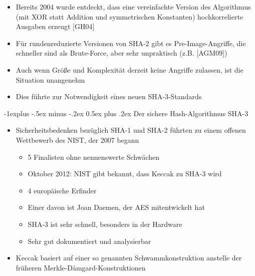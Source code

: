 \documentclass[a4paper]{article}
\makeatletter
\renewcommand{\subsection}{\@startsection{subsection}{2}{0mm}%
 {-1explus -.5ex minus -.2ex}%
 {0.5ex plus .2ex}%
 {\normalfont\normalsize\bfseries}}
\makeatother
\begin{document}
\begin{multicols}{3}
\begin{itemize}
\begin{itemize}
                        \begin{itemize}
                            \item
                                  Bereits 2004 wurde entdeckt, dass eine vereinfachte Version des
                                  Algorithmus (mit XOR statt Addition und symmetrischen Konstanten)
                                  hochkorrelierte Ausgaben erzeugt {[}GH04{]}
                            \item
                                  Für rundenreduzierte Versionen von SHA-2 gibt es
                                  Pre-Image-Angriffe, die schneller sind als Brute-Force, aber sehr
                                  unpraktisch (z.B. {[}AGM09{]})
                            \item
                                  Auch wenn Größe und Komplexität derzeit keine Angriffe zulassen,
                                  ist die Situation unangenehm
                            \item
                                  Dies führte zur Notwendigkeit eines neuen SHA-3-Standards
                        \end{itemize}
              \end{itemize}
    \end{itemize}


    \subsection{Der sichere Hash-Algorithmus
        SHA-3}

    \begin{itemize}
        \item
              Sicherheitsbedenken bezüglich SHA-1 und SHA-2 führten zu einem offenen
              Wettbewerb des NIST, der 2007 begann

              \begin{itemize}
                  \item
                        5 Finalisten ohne nennenswerte Schwächen
                  \item
                        Oktober 2012: NIST gibt bekannt, dass Keccak zu SHA-3 wird
                  \item
                        4 europäische Erfinder
                  \item
                        Einer davon ist Joan Daemen, der AES mitentwickelt hat
                  \item
                        SHA-3 ist sehr schnell, besonders in der Hardware
                  \item
                        Sehr gut dokumentiert und analysierbar
              \end{itemize}
        \item
              Keccak basiert auf einer so genannten Schwammkonstruktion anstelle der
              früheren Merkle-Dåmgard-Konstruktionen


\end{itemize}
\end{multicols}
\end{document}
